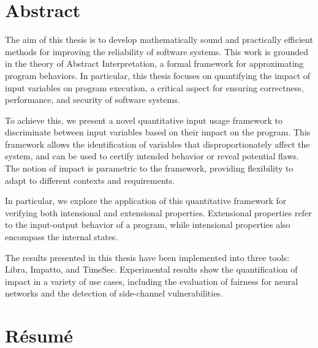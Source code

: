 
\chapter*{Abstract}

The aim of this thesis is to develop mathematically sound and practically efficient methods for improving the reliability of software systems.
This work is grounded in the theory of Abstract Interpretation, a formal framework for approximating program behaviors.
In particular, this thesis focuses on quantifying the impact of input variables on program execution, a critical aspect for ensuring correctness, performance, and security of software systems.

To achieve this, we present a novel quantitative input usage framework to discriminate between input variables based on their impact on the program. This framework allows the identification of variables that disproportionately affect the system, and can be used to certify intended behavior or reveal potential flaws.
The notion of impact is parametric to the framework, providing flexibility to adapt to different contexts and requirements.

In particular, we explore the application of this quantitative framework for verifying both intensional and extensional properties. Extensional properties refer to the input-output behavior of a program, while intensional properties also encompass the internal states.

The results presented in this thesis have been implemented into three tools: Libra, Impatto, and TimeSec.
Experimental results show the quantification of impact in a variety of use cases, including the evaluation of fairness for neural networks and the detection of side-channel vulnerabilities.

\chapter*{Résumé}

